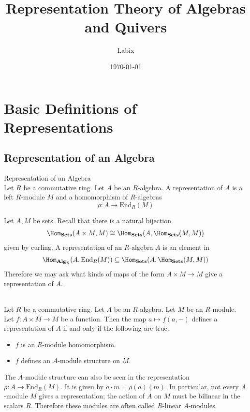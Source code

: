 \documentclass[a4paper]{article}
\title{Representation Theory of Algebras and Quivers}
\author{Labix}
\date{\today}
\begin{document}
\maketitle
\begin{abstract}
\end{abstract}
\pagebreak
\tableofcontents

\pagebreak
\section{Basic Definitions of Representations}
\subsection{Representation of an Algebra}
\begin{defn}{Representation of an Algebra}{}\\
Let $R$ be a commutative ring. Let $A$ be an $R$-algebra. A representation of $A$ is a left $R$-module $M$ and a homomorphism of $R$-algebras $$\rho:A\to\text{End}_R(M)$$
\end{defn}

Let $A,M$ be sets. Recall that there is a natural bijection $$\Hom_{\bold{Sets}}(A\times M,M)\cong\Hom_{\bold{Sets}}(A,\Hom_{\bold{Sets}}(M,M))$$ given by curling. A representation of an $R$-algebra $A$ is an element in $$\Hom_{\bold{Alg}_R}(A,\text{End}_R(M))\subseteq\Hom_{\bold{Sets}}(A,\Hom_{\bold{Sets}}(M,M))$$ Therefore we may ask what kinds of maps of the form $A\times M\to M$ give a representation of $A$. 

\begin{prp}{}{}\\
Let $R$ be a commutative ring. Let $A$ be an $R$-algebra. Let $M$ be an $R$-module. Let $f:A\times M\to M$ be a function. Then the map $a\mapsto f(a,-)$ defines a representation of $A$ if and only if the following are true. 
\begin{itemize}
\item $f$ is an $R$-module homomorphism. 
\item $f$ defines an $A$-module structure on $M$. 
\end{itemize}
\end{prp}

The $A$-module structure can also be seen in the representation $\rho:A\to\text{End}_R(M)$. It is given by $a\cdot m=\rho(a)(m)$. In particular, not every $A$-module $M$ gives a representation; the action of $A$ on $M$ must be bilinear in the scalars $R$. Therefore these modules are often called $R$-linear $A$-modules. \\
\end{document}
